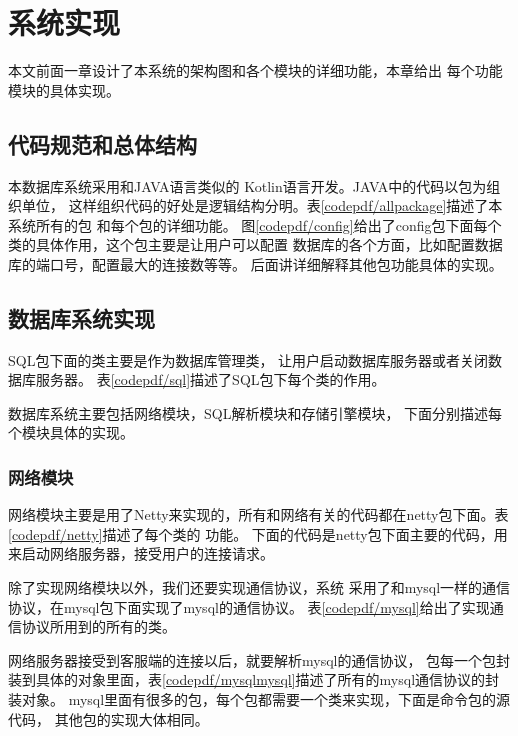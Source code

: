 
\chapter{系统实现}
本文前面一章设计了本系统的架构图和各个模块的详细功能，本章给出
每个功能模块的具体实现。
\section{代码规范和总体结构}
本数据库系统采用和JAVA语言类似的
Kotlin语言开发。JAVA中的代码以包为组织单位，
这样组织代码的好处是逻辑结构分明。表\ref{codepdf/allpackage}描述了本系统所有的包
和每个包的详细功能。
图\ref{codepdf/config}给出了config包下面每个类的具体作用，这个包主要是让用户可以配置
数据库的各个方面，比如配置数据库的端口号，配置最大的连接数等等。
后面讲详细解释其他包功能具体的实现。
\section{数据库系统实现}
SQL包下面的类主要是作为数据库管理类，
让用户启动数据库服务器或者关闭数据库服务器。
表\ref{codepdf/sql}描述了SQL包下每个类的作用。

数据库系统主要包括网络模块，SQL解析模块和存储引擎模块，
下面分别描述每个模块具体的实现。
\subsection{网络模块}
网络模块主要是用了Netty来实现的，所有和网络有关的代码都在netty包下面。表\ref{codepdf/netty}描述了每个类的
功能。
下面的代码是netty包下面主要的代码，用来启动网络服务器，接受用户的连接请求。



除了实现网络模块以外，我们还要实现通信协议，系统
采用了和mysql一样的通信协议，在mysql包下面实现了mysql的通信协议。
表\ref{codepdf/mysql}给出了实现通信协议所用到的所有的类。

网络服务器接受到客服端的连接以后，就要解析mysql的通信协议，
包每一个包封装到具体的对象里面，表\ref{codepdf/mysqlmysql}描述了所有的mysql通信协议的封装对象。
mysql里面有很多的包，每个包都需要一个类来实现，下面是命令包的源代码，
其他包的实现大体相同。

